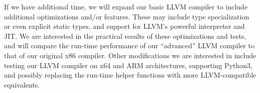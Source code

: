 \documentclass[11pt]{article}
\begin{document}
If we have additional time, we will expand our basic LLVM compiler
to include additional optimizations and/or features. These
may include type specialization or even explicit static types, and
support for LLVM's powerful interpreter and JIT.
We are interested in the practical results of these
optimizations and tests, and will compare the run-time performance of
our ``advanced'' LLVM
compiler to that of our original x86 compiler. Other modifications we are interested
in include testing our LLVM compiler on x64 and ARM
architectures, supporting Python3, and possibly replacing the run-time
helper functions with more LLVM-compatible equivalents.

\nocite{*}
\printbibliography
\end{document}

